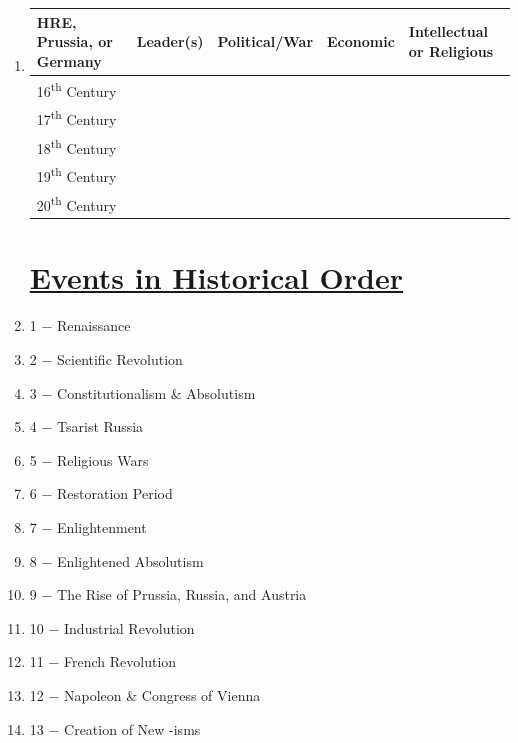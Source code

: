 \documentclass[12pt]{article}
\begin{document}
\begin{enumerate}
\item \begin{tabular}{p{} p{} p{} p{} p{}}

HRE, Prussia, or Germany & Leader(s) & Political/War & Economic & Intellectual or Religious \\
\hline
16\textsuperscript{th} Century & & & & \\
\hline
17\textsuperscript{th} Century & & & & \\
\hline
18\textsuperscript{th} Century & & & & \\
\hline
19\textsuperscript{th} Century & & & & \\
\hline
20\textsuperscript{th} Century & & & & \\

\end{tabular}

\section{\underline{Events in Historical Order}}

\item 1 $-$ Renaissance

\item 2 $-$ Scientific Revolution

\item 3 $-$ Constitutionalism \& Absolutism

\item 4 $-$ Tsarist Russia 
  
\item 5 $-$ Religious Wars

\item 6 $-$ Restoration Period

\item 7 $-$ Enlightenment

\item 8 $-$ Enlightened Absolutism

\item 9 $-$ The Rise of Prussia, Russia, and Austria

\item 10 $-$ Industrial Revolution

\item 11 $-$ French Revolution

\item 12 $-$ Napoleon \& Congress of Vienna

\item 13 $-$ Creation of New -isms


\end{enumerate}
\end{document}
